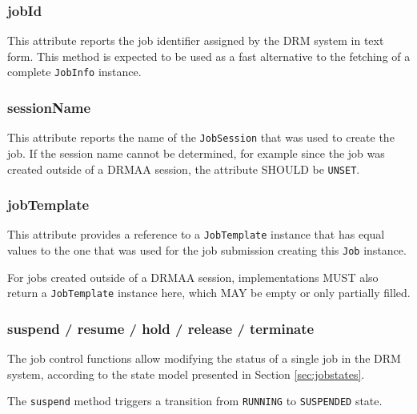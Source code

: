 \documentclass{article}
\newcommand{\h}[1]{\lstinline|#1|}
\newcommand{\rat}[1]{}
\begin{document}
\subsubsection{jobId}

This attribute reports the job identifier assigned by the DRM system in text form. This method is expected to be used as a fast alternative to the fetching of a complete \h{JobInfo} instance.

\subsubsection{sessionName}

This attribute reports the name of the \h{JobSession} that was used to create the job. If the session name cannot be determined, for example since the job was created outside of a DRMAA session, the attribute SHOULD be \h{UNSET}.

\rat{June 29th 2011 conf call decided to return session names instead of session objects. This keeps the consistent approach that instantiated session objects represent a live ``connection'' to the DRMS. Connecting to the referenced session is then a separate explicit step in the application. It also supports better that people create instances from jobs created outside of a DRMAA session.
}

\subsubsection{jobTemplate}

This attribute provides a reference to a \h{JobTemplate} instance that has equal values to the one that was used for the job submission creating this \h{Job} instance.

For jobs created outside of a DRMAA session, implementations MUST also return a \h{JobTemplate} instance here, which MAY be empty or only partially filled.
 
\subsubsection{suspend / resume / hold / release / terminate}
\label{sec:jobcontrolfunctions}

The job control functions allow modifying the status of a single job in the DRM system, according to the state model presented in Section \ref{sec:jobstates}. 

The \h{suspend} method triggers a transition from \h{RUNNING} to \h{SUSPENDED} state.
\end{document}
